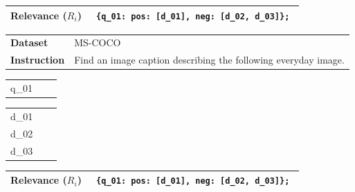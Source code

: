 \begin{table}[ht!]

\begin{tabularx}{\textwidth}{l Z}
\textbf{Relevance ($R_i$)} & \texttt{
\{q\_01: {pos: [d\_01]}, neg: [d\_02, d\_03]\};
} \\
\bottomrule
\end{tabularx}

\vspace{1.5em} %

\begin{tabularx}{\textwidth}{l Z}
\toprule
{} \textbf{Dataset} & MS-COCO \\
\textbf{Instruction} & Find an image caption describing the following everyday image. \\
\bottomrule
\end{tabularx}


\begin{tabularx}{\textwidth}{l p{8cm} Z }
  \\
\midrule
q\_01 &  &  \\
\bottomrule
\end{tabularx}


\begin{tabularx}{\textwidth}{l Z p{0cm}}
  \\
\midrule
d\_01 &  &  \\
d\_02 &  &  \\
d\_03 &  &  \\
\bottomrule
\end{tabularx}


\begin{tabularx}{\textwidth}{l Z}
\textbf{Relevance ($R_i$)} & \texttt{
\{q\_01: {pos: [d\_01]}, neg: [d\_02, d\_03]\};
} \\
\bottomrule
\end{tabularx}

\end{table}
